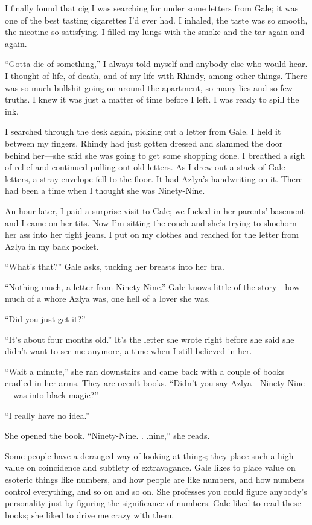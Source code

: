 I finally found that cig I was searching for under some letters from
Gale; it was one of the best tasting cigarettes I'd ever had. I inhaled,
the taste was so smooth, the nicotine so satisfying. I filled my lungs
with the smoke and the tar again and again.

``Gotta die of something,'' I always told myself and anybody else who
would hear. I thought of life, of death, and of my life with Rhindy,
among other things. There was so much bullshit going on around the
apartment, so many lies and so few truths. I knew it was just a matter
of time before I left. I was ready to spill the ink.

I searched through the desk again, picking out a letter from Gale. I
held it between my fingers. Rhindy had just gotten dressed and slammed
the door behind her---she said she was going to get some shopping done.
I breathed a sigh of relief and continued pulling out old letters. As I
drew out a stack of Gale letters, a stray envelope fell to the floor. It
had Azlya's handwriting on it. There had been a time when I thought she
was Ninety-Nine.

An hour later, I paid a surprise visit to Gale; we fucked in her
parents' basement and I came on her tits. Now I'm sitting the couch and
she's trying to shoehorn her ass into her tight jeans. I put on my
clothes and reached for the letter from Azlya in my back pocket.

``What's that?'' Gale asks, tucking her breasts into her bra.

``Nothing much, a letter from Ninety-Nine.'' Gale knows little of the
story---how much of a whore Azlya was, one hell of a lover she was.

``Did you just get it?''

``It's about four months old.'' It's the letter she wrote right before
she said she didn't want to see me anymore, a time when I still believed
in her.

``Wait a minute,'' she ran downstairs and came back with a couple of
books cradled in her arms. They are occult books. ``Didn't you say
Azlya---Ninety-Nine---was into black magic?''

``I really have no idea.''

She opened the book. ``Ninety-Nine. . .nine,'' she reads.

Some people have a deranged way of looking at things; they place such a
high value on coincidence and subtlety of extravagance. Gale likes to
place value on esoteric things like numbers, and how people are like
numbers, and how numbers control everything, and so on and so on. She
professes you could figure anybody's personality just by figuring the
significance of numbers. Gale liked to read these books; she liked to
drive me crazy with them.

